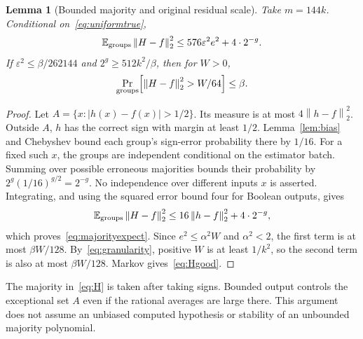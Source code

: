 \documentclass[11pt]{article}
\newtheorem{lemma}[theorem]{Lemma}
\theoremstyle{remark}\newtheorem{remark}[theorem]{Remark}
\newcommand{\E}{\mathbb E}
\newcommand{\norm}[1]{\left\|#1\right\|}
\begin{document}
\begin{lemma}[Bounded majority and original residual scale]\label{lem:majority}
Take $m=144k$. Conditional on~\eqref{eq:uniformtrue},
\begin{equation}\label{eq:majorityexpect}
 \E_{\rm groups}\norm{H-f}_2^2\le576\varepsilon^2e^2+4\cdot2^{-g}.
\end{equation}
If $\varepsilon^2\le\beta/262144$ and $2^g\ge512k^2/\beta$, then for $W>0$,
\begin{equation}\label{eq:Hgood}
 \Pr_{\rm groups}\!\left[\norm{H-f}_2^2>W/64\right]\le\beta.
\end{equation}
\end{lemma}
\begin{proof}
Let $A=\{x:|h(x)-f(x)|>1/2\}$. Its measure is at most $4\norm{h-f}_2^2$. Outside $A$, $h$ has the correct sign with margin at least $1/2$. Lemma~\ref{lem:bias} and Chebyshev bound each group's sign-error probability there by $1/16$. For a fixed such $x$, the groups are independent conditional on the estimator batch. Summing over possible erroneous majorities bounds their probability by
$2^g(1/16)^{g/2}=2^{-g}$.
No independence over different inputs $x$ is asserted. Integrating, and using the squared error bound four for Boolean outputs, gives
\[
 \E_{\rm groups}\norm{H-f}_2^2
 \le16\norm{h-f}_2^2+4\cdot2^{-g},
\]
which proves~\eqref{eq:majorityexpect}. Since $e^2\le\alpha^2 W$ and $\alpha^2<2$, the first term is at most $\beta W/128$. By~\eqref{eq:granularity}, positive $W$ is at least $1/k^2$, so the second term is also at most $\beta W/128$. Markov gives~\eqref{eq:Hgood}.
\end{proof}

The majority in~\eqref{eq:H} is taken after taking signs. Bounded output controls the exceptional set $A$ even if the rational averages are large there. This argument does not assume an unbiased computed hypothesis or stability of an unbounded majority polynomial.
\end{document}
